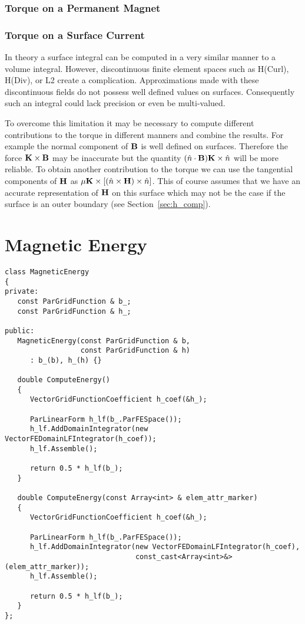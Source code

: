 \documentclass[12pt]{article}
\providecommand{\B}{\mbox{\bf B}}
\renewcommand{\H}{\mbox{\bf H}}
\providecommand{\K}{\mbox{\bf K}}
\newcommand{\refSec}[1]{Section~\ref{sec:#1}}
\begin{document}
\subsubsection{Torque on a Permanent Magnet}

\subsubsection{Torque on a Surface Current}

In theory a surface integral can be computed in a very similar manner
to a volume integral. However, discontinuous finite element spaces
such as H(Curl), H(Div), or L2 create a complication. Approximations
made with these discontinuous fields do not possess well defined
values on surfaces. Consequently such an integral could lack precision
or even be multi-valued.

To overcome this limitation it may be necessary to compute different
contributions to the torque in different manners and combine the
results. For example the normal component of $\B$ is well defined on
surfaces. Therefore the force $\K\times\B$ may be inaccurate but the
quantity $(\hat{n}\cdot\B)\K\times\hat{n}$ will be more reliable. To
obtain another contribution to the torque we can use the tangential
components of $\H$ as
$\mu\K\times\left[\left(\hat{n}\times\H\right)\times\hat{n}\right]$. This
of course assumes that we have an accurate representation of $\H$ on
this surface which may not be the case if the surface is an outer
boundary (see \refSec{h_comp}).

\appendix
\section{Magnetic Energy}

\begin{verbatim}
class MagneticEnergy
{
private:
   const ParGridFunction & b_;
   const ParGridFunction & h_;

public:
   MagneticEnergy(const ParGridFunction & b,
                  const ParGridFunction & h)
      : b_(b), h_(h) {}

   double ComputeEnergy()
   {
      VectorGridFunctionCoefficient h_coef(&h_);

      ParLinearForm h_lf(b_.ParFESpace());
      h_lf.AddDomainIntegrator(new VectorFEDomainLFIntegrator(h_coef));
      h_lf.Assemble();

      return 0.5 * h_lf(b_);
   }

   double ComputeEnergy(const Array<int> & elem_attr_marker)
   {
      VectorGridFunctionCoefficient h_coef(&h_);

      ParLinearForm h_lf(b_.ParFESpace());
      h_lf.AddDomainIntegrator(new VectorFEDomainLFIntegrator(h_coef),
                               const_cast<Array<int>&>(elem_attr_marker));
      h_lf.Assemble();

      return 0.5 * h_lf(b_);
   }
};
\end{verbatim}
\end{document}
